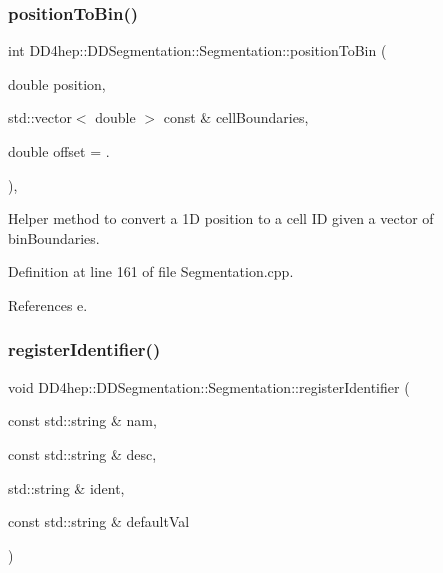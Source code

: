 \subsubsection{\texorpdfstring{position\+To\+Bin()}{positionToBin()}\hspace{0.1cm}{\footnotesize\ttfamily [2/2]}}
{\footnotesize\ttfamily int D\+D4hep\+::\+D\+D\+Segmentation\+::\+Segmentation\+::position\+To\+Bin (\begin{DoxyParamCaption}\item[{double}]{position,  }\item[{std\+::vector$<$ double $>$ const \&}]{cell\+Boundaries,  }\item[{double}]{offset = {.} }\end{DoxyParamCaption})\hspace{0.3cm}{\ttfamily [static]}, {\ttfamily [protected]}}



Helper method to convert a 1D position to a cell ID given a vector of bin\+Boundaries. 



Definition at line 161 of file Segmentation.\+cpp.



References e.

\hypertarget{class_d_d4hep_1_1_d_d_segmentation_1_1_segmentation_ab513ba2af3efb21c7ca2e17c6829aeca}{}\label{class_d_d4hep_1_1_d_d_segmentation_1_1_segmentation_ab513ba2af3efb21c7ca2e17c6829aeca} 
\subsubsection{\texorpdfstring{register\+Identifier()}{registerIdentifier()}}
{\footnotesize\ttfamily void D\+D4hep\+::\+D\+D\+Segmentation\+::\+Segmentation\+::register\+Identifier (\begin{DoxyParamCaption}\item[{const std\+::string \&}]{nam,  }\item[{const std\+::string \&}]{desc,  }\item[{std\+::string \&}]{ident,  }\item[{const std\+::string \&}]{default\+Val }\end{DoxyParamCaption})\hspace{0.3cm}{\ttfamily [protected]}}



